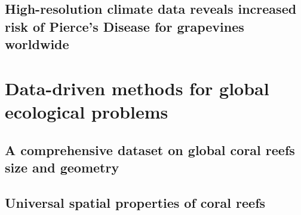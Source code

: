 \documentclass[
	10pt, %
	fleqn, %
	a4paper, %
]{LegrandOrangeBook}
\begin{document}
\chapter{High-resolution climate data reveals increased risk of Pierce's
  Disease for grapevines worldwide}
%


\part{Data-driven methods for global ecological problems}

\chapterspaceabove{6.75cm}
\chapterspacebelow{7.25cm}

\chapter{A comprehensive dataset on global coral reefs size and geometry}
%

\chapterspaceabove{6.75cm}
\chapterspacebelow{7.25cm}

\chapter{Universal spatial properties of coral reefs}
%

\chapterspaceabove{6.75cm}
\chapterspacebelow{7.25cm}
\end{document}
